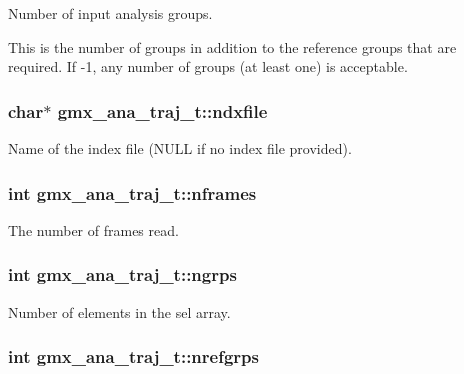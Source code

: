 \-Number of input analysis groups. 

\-This is the number of groups in addition to the reference groups that are required. \-If -\/1, any number of groups (at least one) is acceptable. \hypertarget{structgmx__ana__traj__t_aaf24acfcd21e921088dc2bd12473d616}{
\subsubsection[{ndxfile}]{\setlength{\rightskip}{0pt plus 5cm}char$\ast$ {\bf gmx\-\_\-ana\-\_\-traj\-\_\-t\-::ndxfile}}}\label{structgmx__ana__traj__t_aaf24acfcd21e921088dc2bd12473d616}
\-Name of the index file (\-N\-U\-L\-L if no index file provided). \hypertarget{structgmx__ana__traj__t_a42136ddead4d9928b76591598b9daa2b}{
\subsubsection[{nframes}]{\setlength{\rightskip}{0pt plus 5cm}int {\bf gmx\-\_\-ana\-\_\-traj\-\_\-t\-::nframes}}}\label{structgmx__ana__traj__t_a42136ddead4d9928b76591598b9daa2b}
\-The number of frames read. \hypertarget{structgmx__ana__traj__t_ae37017abad437e0c60648ee122b078cf}{
\subsubsection[{ngrps}]{\setlength{\rightskip}{0pt plus 5cm}int {\bf gmx\-\_\-ana\-\_\-traj\-\_\-t\-::ngrps}}}\label{structgmx__ana__traj__t_ae37017abad437e0c60648ee122b078cf}
\-Number of elements in the {\ttfamily sel} array. \hypertarget{structgmx__ana__traj__t_ac88221ec4ace1f7b856fd8cc992786d9}{
\subsubsection[{nrefgrps}]{\setlength{\rightskip}{0pt plus 5cm}int {\bf gmx\-\_\-ana\-\_\-traj\-\_\-t\-::nrefgrps}}}\label{structgmx__ana__traj__t_ac88221ec4ace1f7b856fd8cc992786d9}

